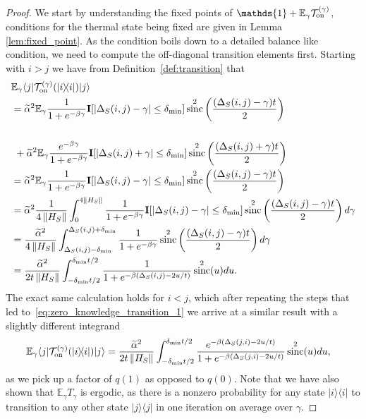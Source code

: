 \documentclass[
 amsmath,amssymb,
 aps,
onecolumn, 
nofootinbib]{revtex4-2}
\newcommand{\on}{\rm on}
\newcommand{\ket}[1]{|#1\rangle}
\newcommand{\bra}[1]{\langle #1|}
\newcommand{\ketbra}[2]{| #1\rangle\! \langle #2|}
\newcommand{\norm}[1]{\left\| #1 \right\|}
\newcommand{\EE}{\mathbb{E}}
\newcommand{\TT}{\mathcal{T}}
\newcommand{\identity}{\mathds{1}}
\DeclareMathOperator{\sinc}{sinc}
\begin{document}
\begin{proof}
    We start by understanding the fixed points of $\identity + \EE_\gamma \TT_{\on}^{(\gamma)}$, conditions for the thermal state being fixed are given in Lemma \ref{lem:fixed_point}. As the condition boils down to a detailed balance like condition, we need to compute the off-diagonal transition elements first. Starting with $i > j$ we have from Definition~\ref{def:transition} that
    \begin{align}
        &\EE_\gamma \bra{j} \TT_{\on}^{(\gamma)}(\ketbra{i}{i})\ket{j} \nonumber \\
        &=  \widetilde{\alpha}^2 \EE_{\gamma} \frac{1}{1 + e^{-\beta \gamma}} \mathbf{I}[|\Delta_S(i,j) - \gamma| \le \delta_{\min}]  \sinc^2\left(\frac{(\Delta_S(i,j) - \gamma)t}{2}\right) \\ \nonumber \\
        &~+ \widetilde{\alpha}^2 \EE_{\gamma} \frac{e^{-\beta \gamma}}{1 + e^{-\beta \gamma}} \mathbf{I}[|\Delta_S(i,j) + \gamma| \le \delta_{\min}]  \sinc^2\left(\frac{(\Delta_S(i,j) + \gamma)t}{2}\right) \\
        &= \widetilde{\alpha}^2 \EE_{\gamma} \frac{1}{1 + e^{-\beta \gamma}} \mathbf{I}[|\Delta_S(i,j) - \gamma| \le \delta_{\min}]  \sinc^2\left(\frac{(\Delta_S(i,j) - \gamma)t}{2}\right) \\
        &= \widetilde{\alpha}^2 \frac{1}{4 \norm{H_S}} \int_{0}^{4 \norm{H_S}} \frac{1}{1 + e^{-\beta \gamma}} \mathbf{I}[|\Delta_S(i,j) - \gamma| \le \delta_{\min}]  \sinc^2\left(\frac{(\Delta_S(i,j) - \gamma)t}{2}\right) d\gamma \\
        &=  \frac{\widetilde{\alpha}^2}{4 \norm{H_S}} \int_{\Delta_S(i,j) - \delta_{\min}}^{\Delta_S(i,j) + \delta_{\min}} \frac{1}{1 + e^{-\beta \gamma}}  \sinc^2\left(\frac{(\Delta_S(i,j) - \gamma)t}{2}\right) d\gamma \\
        &= \frac{\widetilde{\alpha}^2}{2 t \norm{H_S}} \int_{-\delta_{\min} t /2}^{\delta_{\min} t / 2} \frac{1}{1 + e^{-\beta (\Delta_S(i, j) - 2 u /t)}} \sinc^2(u) du. \label{eq:zero_knowledge_transition_1}
    \end{align}
    The exact same calculation holds for $i < j$, which after repeating the steps that led to~\eqref{eq:zero_knowledge_transition_1} we arrive at a similar result  with a slightly different integrand
    \begin{align}
        \EE_\gamma \bra{j} \TT_{\on}^{(\gamma)}(\ketbra{i}{i})\ket{j} &= \frac{\widetilde{\alpha}^2}{2 t \norm{H_S}} \int_{-\delta_{\min} t /2}^{\delta_{\min} t / 2} \frac{e^{-\beta (\Delta_S(j,i) - 2 u /t)}}{1 + e^{-\beta (\Delta_S(j,i) - 2 u /t)}} \sinc^2(u) du,\label{eq:zero_knowledge_transition_2}
    \end{align}
    as we pick up a factor of $q(1)$ as opposed to $q(0)$. Note that we have also shown that $\EE_\gamma T_\gamma$ is ergodic, as there is a nonzero probability for any state $\ketbra{i}{i}$ to transition to any other state $\ketbra{j}{j}$ in one iteration on average over $\gamma$.


\end{proof}
\end{document}
